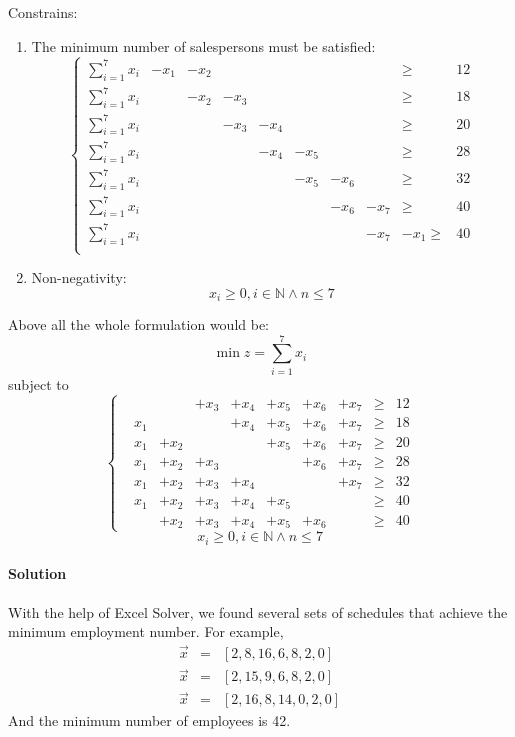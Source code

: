 \documentclass{article}
\numberwithin{equation}{section}
\begin{document}
Constrains:
\begin{enumerate}
\item The minimum number of salespersons must be satisfied:\\
\begin{equation}
	\left\{
	\begin{array}{rrrrrrrrrr}
	\sum_{i=1}^{7}x_i&-x_1&-x_2&&&&&&\geqslant& 12\\
	\sum_{i=1}^{7}x_i&&-x_2&-x_3&&&&&\geqslant& 18\\
	\sum_{i=1}^{7}x_i&&&-x_3&-x_4&&&&\geqslant& 20\\
	\sum_{i=1}^{7}x_i&&&&-x_4&-x_5&&&\geqslant& 28\\
	\sum_{i=1}^{7}x_i&&&&&-x_5&-x_6&&\geqslant& 32\\
	\sum_{i=1}^{7}x_i&&&&&&-x_6&-x_7&\geqslant& 40\\
	\sum_{i=1}^{7}x_i&&&&&&&-x_7&-x_1\geqslant& 40\\
	\end{array}\right.	
\end{equation}
\item Non-negativity:\\
\begin{equation}
x_i\geqslant 0,i\in \mathbb{N}\wedge n\leqslant7
\end{equation}
\end{enumerate}

Above all the whole formulation would be:
\begin{equation}
\min z=\sum_{i=1}^{7}x_i
\end{equation}
subject to\\
\begin{equation}
\left\{
\begin{array}{rrrrrrrrrr}
&&&+x_3&+x_4&+x_5&+x_6&+x_7&\geqslant& 12\\
& x_1&&&+x_4&+x_5&+x_6&+x_7&\geqslant& 18\\
& x_1&+x_2&&&+x_5&+x_6&+x_7&\geqslant& 20\\
& x_1&+x_2&+x_3&&&+x_6&+x_7&\geqslant& 28\\
& x_1&+x_2&+x_3&+x_4&&&+x_7&\geqslant& 32\\
& x_1&+x_2&+x_3&+x_4&+x_5&&&\geqslant& 40\\
&&+x_2&+x_3&+x_4&+x_5&+x_6&&\geqslant& 40
\end{array}\right.
\end{equation}
\[x_i\geqslant 0,i\in \mathbb{N}\wedge n\leqslant7\]

\paragraph{Solution}
With the help of Excel Solver, we found several sets of schedules that achieve the minimum employment number. For example,
\begin{equation}
\begin{array}{rcl}
\vec{x}&=&[2,8,16,6,8,2,0]\\
\vec{x}&=&[2,15,9,6,8,2,0]\\
\vec{x}&=&[2,16,8,14,0,2,0]
\end{array}
\end{equation}
And the minimum number of employees is 42.
\end{document}
